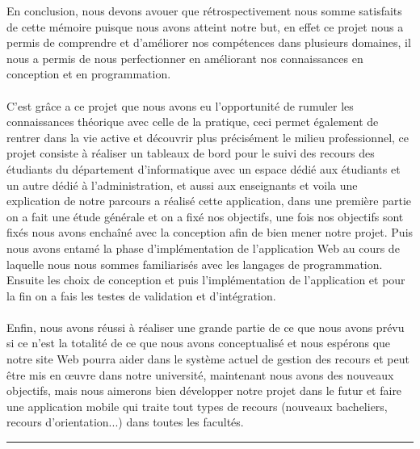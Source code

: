 \documentclass[12pt]{report}
\begin{document}
En conclusion, nous devons avouer que rétrospectivement nous somme satisfaits de cette mémoire puisque nous avons atteint notre but, en effet ce projet nous a permis de comprendre et d'améliorer nos compétences dans plusieurs domaines, il nous a permis de nous perfectionner en améliorant nos connaissances en conception et en programmation.
\\\\
C'est grâce a ce projet que nous avons eu l'opportunité de rumuler les connaissances théorique avec celle de la pratique, ceci permet également de rentrer dans la vie active et découvrir plus précisément le milieu professionnel, ce projet consiste à réaliser un tableaux de bord pour le suivi des recours des étudiants du département d’informatique avec un espace dédié aux étudiants et un autre dédié à l'administration, et aussi aux enseignants et voila une explication de notre parcours a réalisé cette application, dans une première partie on a fait une étude générale et on a fixé nos objectifs, une fois nos objectifs sont fixés nous avons enchaîné avec la conception afin de bien mener notre projet. Puis nous avons entamé la phase d’implémentation de l’application Web au cours de laquelle nous nous sommes familiarisés avec les langages de programmation. Ensuite les choix de conception et puis l'impl\'ementation de l’application et pour la fin on a fais les testes de validation et d'intégration.
\\\\
Enfin, nous avons réussi à réaliser une grande partie de ce que nous avons prévu si ce n'est la totalité de ce que nous avons conceptualisé et nous espérons que notre site Web pourra aider dans le système actuel de gestion des recours et peut être mis en œuvre dans notre université, maintenant nous avons des nouveaux objectifs, mais nous aimerons bien développer notre projet dans le futur et faire une application mobile qui traite tout types de recours (nouveaux bacheliers, recours d'orientation...) dans toutes les facultés.

\newpage

\def\thispagestyle#1{}
\thispagestyle{empty}
\pagestyle{empty}

\begin{center}
    {\color{Blue} \rule{5.5in}{1.4mm} }\\
    \vspace{0.1in}
    \scshape{\fontsize{34}{46}{\bfseries{\color{Blue}{Bibliographie}}}}
    \\
    \vspace{0.5in}
\end{center}
\renewcommand{\ULdepth}{1.8pt}
\end{document}

